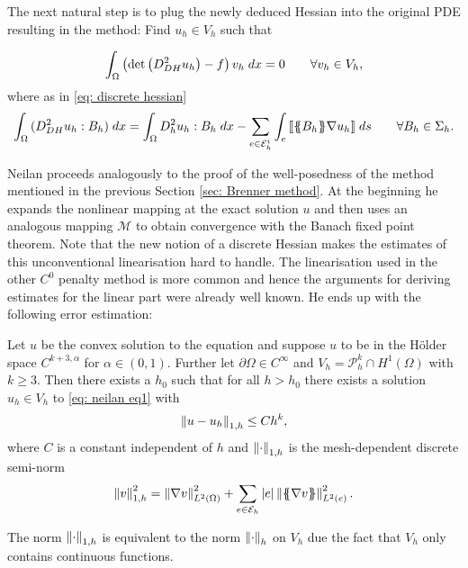 The next natural step is to plug the newly deduced Hessian into the original \MA PDE resulting in the method: Find $u_h \in V_h$ such that

\begin{align}
		\int_{\Omega} {{ \left(\det{\left(D_{DH}^2 u_h\right)} - f \right) v_h}\;dx} = 0 \qquad \forall v_h \in V_h, \label{eq: neilan eq1}
\end{align}
where as in \eqref{eq: discrete hessian}
	\begin{align*}
		\int_{\Omega} {{ (D_{DH}^2 u_h : B_h) }\;dx}
		= \int_{\Omega} {{ D^2_h u_h: B_h}\;dx}
			 -\sum_{ e \in \mathcal{E}_h^i} \int_{e} {{  \llbracket \{\!\!\{ B_h \}\!\!\} \nabla u_h  \rrbracket}\;ds}\qquad \forall B_h \in \Sigma_h.
	\end{align*}

Neilan proceeds analogously to the proof of the well-posedness of the method mentioned in the previous Section \ref{sec: Brenner method}. At the beginning he expands the nonlinear mapping at the exact solution $u$ and then uses an analogous mapping $\mathcal M$ to obtain convergence with the Banach fixed point theorem. Note that the new notion of a discrete Hessian makes the estimates of this unconventional linearisation hard to handle. The linearisation used in the other $C^0$ penalty method is more common and hence the arguments for deriving estimates for the linear part were already well known.
He ends up with the following error estimation:
\begin{theorem} \label{thm: error estimate Neilan}
	Let $u$ be the convex solution to the \MA equation and suppose $u$ to be in the Hölder space $C^{k+3,\alpha}$ for $\alpha \in (0,1)$. Further let $\partial \Omega \in C^\infty$ and $V_h = \mathcal P^k_h \cap H^1(\Omega)$ with $k\geq3$. Then there exists a $h_0$ such that for all $h > h_0$ there exists a solution $u_h \in V_h$ to \eqref{eq: neilan eq1} with
	\[
		\left\lVert u-u_h \right\rVert_{1,h} \leq C h^k, 
	\]
	where $C$ is a constant independent of $h$ and $\left\lVert \cdot  \right\rVert_{1,h}$ is the mesh-dependent discrete semi-norm 
	\[
		\left\lVert v \right\rVert_{1,h}^2 = \left\lVert \nabla v  \right\rVert^2_{L^2(\Omega)} + \sum_{e \in \mathcal{E}_h} |e| \left\lVert \{\!\!\{ \nabla v \}\!\!\} \right\rVert^2_{L^2(e)}.
	\]
\end{theorem}
The norm $\left\lVert \cdot \right\rVert_{1,h}$ is equivalent to the norm $\left\lVert \cdot \right\rVert_{h}$ on $V_h$ due the fact that $V_h$ only contains continuous functions.

